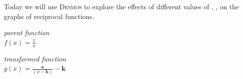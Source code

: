 \vspace{\parskip}
Today we will use {\scshape Desmos} 
to explore the effects of different values of 
, ,  
on the graphs of reciprocal functions. 

\begin{tcbraster}[
    raster columns = 2,
    raster equal height,
    raster left skip = 0.5in, raster right skip = 0.5in, raster column skip = 0.75in,
    raster before skip = 0.25in, raster after skip = 0.25in,
]
    \begin{tcolorbox}[]
        \centering
        {\itshape parent function}\\[1\baselineskip]
        \Large
        $ f(x) = \frac{1}{x} $
    \end{tcolorbox}
    \begin{tcolorbox}[]
        \centering
        {\itshape transformed function}\\[1\baselineskip]
        \Large
        $g(x) = \frac{\bm{a}}{(x-\bm{h})} - \bm{k}$
    \end{tcolorbox}
\end{tcbraster}

\vfill 

